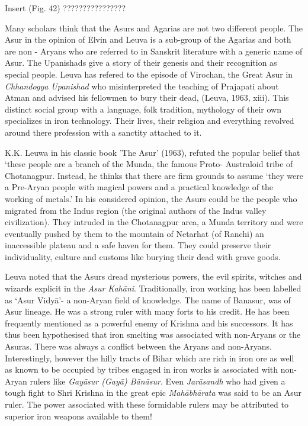 Insert (Fig. 42) ????????????????

Many scholars think that the Asurs and Agarias are not two different people. The Asur in the opinion of Elvin and Leuva is a sub-group of the Agarias and both are non - Aryans who are referred to in Sanskrit literature with a generic name of Asur. The Upanishads give a story of their genesis and their recognition as special people. Leuva has refered to the episode of Virochan, the Great Asur in {\it Chhandogya Upanishad} who misinterpreted the teaching of Prajapati about Atman and advised his fellowmen to bury their dead, (Leuva, 1963, xiii). This distinct social group with a language, folk tradition, mythology of their own specializes in iron technology. Their lives, their religion and everything revolved around there profession with a sanctity attached to it. 

K.K. Leuwa in his classic book 'The Asur’ (1963), refuted the popular belief that ‘these people are a branch of the Munda, the famous Proto- Australoid tribe of Chotanagpur. Instead, he thinks that there are firm grounds to assume ‘they were a Pre-Aryan people with magical powers and a practical knowledge of the working of metals.’ In his considered opinion, the Asurs could be the people who migrated from the Indus region (the original authors of the Indus valley civilization). They intruded in the Chotanagpur area, a Munda territory and were eventually pushed by them to the mountain of Netarhat (of Ranchi) an inaccessible plateau and a safe haven for them. They could preserve their individuality, culture and customs like burying their dead with grave goods. 

Leuva noted that the Asurs dread mysterious powers, the evil spirits, witches and wizards explicit in the {\it Asur Kahāni}. Traditionally, iron working has been labelled as ‘Asur Vidyā’- a non-Aryan field of knowledge. The name of Banasur, was of Asur lineage. He was a strong ruler with many forts to his credit. He has been frequently mentioned as a powerful enemy of Krishna and his successors. It has thus been hypothesised that iron smelting was associated with non-Aryans or the Asuras. There was always a conflict between the Aryans and non-Aryans. Interestingly, however the hilly tracts of Bihar which are rich in iron ore as well as known to be occupied by tribes engaged in iron works is associated with non-Aryan rulers like {\it Gayāsur (Gayā) Bānāsur}. Even {\it Jarāsandh} who had given a tough fight to Shri Krishna in the great epic {\it Mahābhārata} was said to be an Asur ruler. The power associated with these formidable rulers may be attributed to superior iron weapons available to them!

